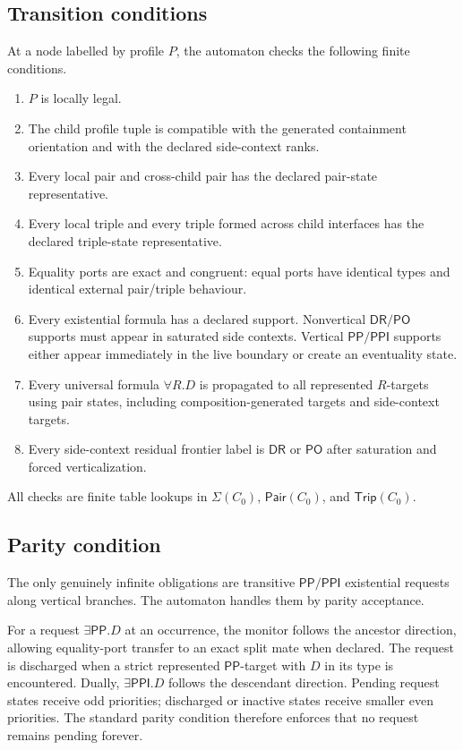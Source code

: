 \documentclass[11pt]{article}
\newcommand{\PP}{\mathsf{PP}}
\newcommand{\PPI}{\mathsf{PPI}}
\newcommand{\PO}{\mathsf{PO}}
\newcommand{\DR}{\mathsf{DR}}
\newcommand{\Pair}{\mathsf{Pair}}
\newcommand{\Trip}{\mathsf{Trip}}
\begin{document}
\subsection{Transition conditions}

At a node labelled by profile $P$, the automaton checks the following finite conditions.

\begin{enumerate}[label=(C\arabic*)]
\item $P$ is locally legal.
\item The child profile tuple is compatible with the generated containment orientation and with the declared side-context ranks.
\item Every local pair and cross-child pair has the declared pair-state representative.
\item Every local triple and every triple formed across child interfaces has the declared triple-state representative.
\item Equality ports are exact and congruent: equal ports have identical types and identical external pair/triple behaviour.
\item Every existential formula has a declared support.  Nonvertical $\DR/\PO$ supports must appear in saturated side contexts.  Vertical $\PP/\PPI$ supports either appear immediately in the live boundary or create an eventuality state.
\item Every universal formula $\forall R.D$ is propagated to all represented $R$-targets using pair states, including composition-generated targets and side-context targets.
\item Every side-context residual frontier label is $\DR$ or $\PO$ after saturation and forced verticalization.
\end{enumerate}

All checks are finite table lookups in $\Sigma(C_0)$, $\Pair(C_0)$, and $\Trip(C_0)$.

\subsection{Parity condition}

The only genuinely infinite obligations are transitive $\PP/\PPI$ existential requests along vertical branches.  The automaton handles them by parity acceptance.

For a request $\exists\PP.D$ at an occurrence, the monitor follows the ancestor direction, allowing equality-port transfer to an exact split mate when declared.  The request is discharged when a strict represented $\PP$-target with $D$ in its type is encountered.  Dually, $\exists\PPI.D$ follows the descendant direction.  Pending request states receive odd priorities; discharged or inactive states receive smaller even priorities.  The standard parity condition therefore enforces that no request remains pending forever.
\end{document}
